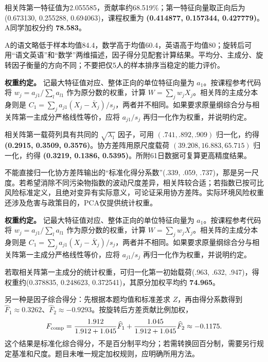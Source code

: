 相关阵第一特征值为2.055585，贡献率约68.519\%；第一特征向量取正向后为(0.673130, 0.255288, 0.694063)，课程权重为 \textbf{(0.414877, 0.157344, 0.427779)}。A同学加权分约 \textbf{78.583}。

A的语文略低于样本均值84.4，数学高于均值60.4，英语高于均值80；旋转后可用``语文英语''和``数学''两维描述，因子得分见配套计算结果。平均分、主成分、旋转因子衡量的方向不同；不要把仅5人的样本排序当稳定的能力评价。



\textbf{权重约定。} 记最大特征值对应、整体正向的单位特征向量为 \(a_1\)。按课程参考代码将 \(w_j=a_{j1}/\sum_l a_{l1}\) 作为原分数的权重，计算 \(W=\sum_jw_jX_j\)。相关阵的主成分本身则是 \(C_1=\sum_ja_{j1}(X_j-\bar X_j)/s_j\)，两者并不相同。如果要求原量纲综合分与相关阵第一主成分严格线性等价，应将 \(a_{j1}/s_j\) 再归一化作为权重，并说明约定。

相关阵第一载荷列具有共同的 \(\sqrt{\lambda_1}\) 因子，可用 \((.741, .892, .909)\) 归一化，约得 \textbf{(0.2915, 0.3509, 0.3576)}。协方差阵用原尺度载荷 \((39.208, 16.883, 65.715)\) 归一化，约得 \textbf{(0.3219, 0.1386, 0.5395)}。所附61日数据可复算更高精度结果。

不能直接归一化协方差阵输出的``标准化得分系数''(.339, .059, .737)，那是另一尺度。若希望消除不同污染物指数的波动尺度差异，相关阵较合适；若指数已按可比风险标准定义，且绝对变异有实际意义，可论证采用协方差阵。实际环境风险权重还涉及危害与政策目的，PCA仅提供统计权重。



\textbf{权重约定。} 记最大特征值对应、整体正向的单位特征向量为 \(a_1\)。按课程参考代码将 \(w_j=a_{j1}/\sum_l a_{l1}\) 作为原分数的权重，计算 \(W=\sum_jw_jX_j\)。相关阵的主成分本身则是 \(C_1=\sum_ja_{j1}(X_j-\bar X_j)/s_j\)，两者并不相同。如果要求原量纲综合分与相关阵第一主成分严格线性等价，应将 \(a_{j1}/s_j\) 再归一化作为权重，并说明约定。

若取相关阵第一主成分的统计权重，可归一化第一初始载荷(.963, .632, .947)，得权重约(0.378835, 0.248623, 0.372541)，其原分加权平均约 \textbf{74.965}。

另一种是因子综合得分：先根据本题均值和标准差求 \(Z\)，再由得分系数得到 \(\widehat F_1\approx0.3262\)、\(\widehat F_2\approx-0.9293\)。按旋转后方差贡献比例加权， \[F_{\rm comp}=\frac{1.912}{1.912+1.045}\widehat F_1+\frac{1.045}{1.912+1.045}\widehat F_2\approx-0.1175.\] 这个结果是标准化综合得分，不是百分制平均分；若需转换回百分制，需要另行规定基准和尺度。题目未唯一规定加权规则，应明确所用方法。

